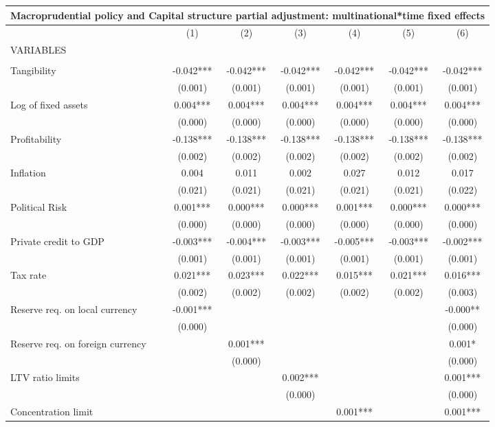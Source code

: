 \begin{tabular}{lcccccc}
\multicolumn{7}{c}{Macroprudential policy and Capital structure partial adjustment: multinational*time fixed effects} \\ \hline
 & (1) & (2) & (3) & (4) & (5) & (6) \\
VARIABLES &  &  &  &  &  &  \\ \hline
 &  &  &  &  &  &  \\
Tangibility & -0.042*** & -0.042*** & -0.042*** & -0.042*** & -0.042*** & -0.042*** \\
 & (0.001) & (0.001) & (0.001) & (0.001) & (0.001) & (0.001) \\
Log of fixed assets & 0.004*** & 0.004*** & 0.004*** & 0.004*** & 0.004*** & 0.004*** \\
 & (0.000) & (0.000) & (0.000) & (0.000) & (0.000) & (0.000) \\
Profitability & -0.138*** & -0.138*** & -0.138*** & -0.138*** & -0.138*** & -0.138*** \\
 & (0.002) & (0.002) & (0.002) & (0.002) & (0.002) & (0.002) \\
Inflation & 0.004 & 0.011 & 0.002 & 0.027 & 0.012 & 0.017 \\
 & (0.021) & (0.021) & (0.021) & (0.021) & (0.021) & (0.022) \\
Political Risk & 0.001*** & 0.000*** & 0.000*** & 0.001*** & 0.000*** & 0.000*** \\
 & (0.000) & (0.000) & (0.000) & (0.000) & (0.000) & (0.000) \\
Private credit to GDP & -0.003*** & -0.004*** & -0.003*** & -0.005*** & -0.003*** & -0.002*** \\
 & (0.001) & (0.001) & (0.001) & (0.001) & (0.001) & (0.001) \\
Tax rate & 0.021*** & 0.023*** & 0.022*** & 0.015*** & 0.021*** & 0.016*** \\
 & (0.002) & (0.002) & (0.002) & (0.002) & (0.002) & (0.003) \\
Reserve req. on local currency & -0.001*** &  &  &  &  & -0.000** \\
 & (0.000) &  &  &  &  & (0.000) \\
Reserve req. on foreign currency &  & 0.001*** &  &  &  & 0.001* \\
 &  & (0.000) &  &  &  & (0.000) \\
LTV ratio limits &  &  & 0.002*** &  &  & 0.001*** \\
 &  &  & (0.000) &  &  & (0.000) \\
Concentration limit &  &  &  & 0.001*** &  & 0.001*** \\

\end{tabular}
